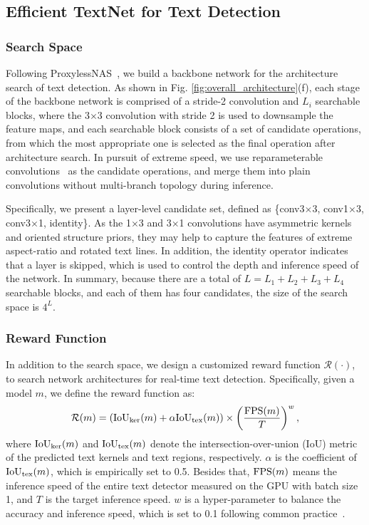 \documentclass[lettersize,journal]{IEEEtran}
\begin{document}
\subsection{Efficient TextNet for Text Detection}

\subsubsection{Search Space}  
Following ProxylessNAS~\cite{cai2018proxylessnas}, we build a backbone network for the architecture search of text detection.
As shown in Fig. \ref{fig:overall_architecture}(f), each stage of the backbone network is comprised of a stride-2 convolution and $L_i$ searchable blocks, where the 3$\times$3 convolution with stride 2 is used to downsample the feature maps, and each searchable block consists of a set of candidate operations, from which the most appropriate one is selected as the final operation after architecture search.
In pursuit of extreme speed, we use reparameterable convolutions~\cite{ding2021repvgg} as the candidate operations, and merge them into plain convolutions without multi-branch topology during inference.

Specifically, we present a layer-level candidate set, defined as \{{\ttfamily conv3$\times$3}, {\ttfamily conv1$\times$3}, {\ttfamily conv3$\times$1}, {\ttfamily identity}\}.
As the 1$\times$3 and 3$\times$1 convolutions have asymmetric kernels and oriented structure priors, they may help to capture the features of extreme aspect-ratio and rotated text lines.
In addition, the identity operator indicates that a layer is skipped, which is used to control the depth and inference speed of the network.
In summary, because there are a total of $L=L_1+L_2+L_3+L_4$ searchable blocks, and each of them has four candidates, the size of the search space is $4^L$.


\subsubsection{Reward Function}
In addition to the search space, we design a customized reward function $\mathcal{R}(\cdot)$, to search network architectures for real-time text detection.
Specifically, given a model $m$, we define the reward function as:
\begin{equation}
	\mathcal{R}(m)=\left( {\rm IoU}_{\rm ker}(m)+\alpha {\rm IoU}_{\rm tex}(m)\right)\times \left(\frac{{\rm FPS}(m)}{T}\right)^w,
	\label{reward_function}
\end{equation}
where ${\rm IoU}_{\rm ker}(m)$ and ${\rm IoU}_{\rm tex}(m)$ denote the intersection-over-union (IoU) metric of the predicted text kernels and text regions, respectively. 
$\alpha$ is the coefficient of ${\rm IoU}_{\rm tex}(m)$, which is empirically set to 0.5.
Besides that, ${\rm FPS}(m)$ means the inference speed of the entire text detector measured on the GPU with batch size 1, and $T$ is the target inference speed. $w$ is a hyper-parameter to balance the accuracy and inference speed, which is set to 0.1 following common practice~\cite{cai2018proxylessnas}.
\end{document}
